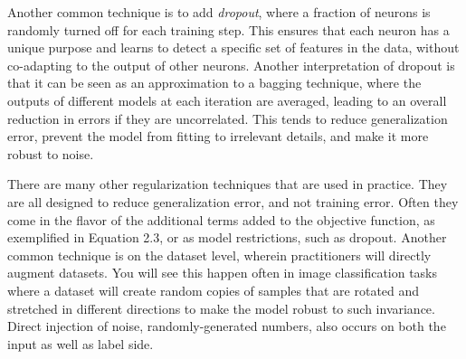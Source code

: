 Another common technique is to add \textit{dropout}, where a fraction of neurons is randomly turned off for each training step.
This ensures that each neuron has a unique purpose and learns to detect a specific set of features in the data, without co-adapting to the output of other neurons.
Another interpretation of dropout is that it can be seen as an approximation to a bagging technique, where the outputs of different models at each iteration are averaged, leading to an overall reduction in errors if they are uncorrelated.
This tends to reduce generalization error, prevent the model from fitting to irrelevant details, and make it more robust to noise.

There are many other regularization techniques that are used in practice. They are all designed to reduce
generalization error, and not training error. Often they come in the flavor of the additional terms added to the
objective function, as exemplified in Equation 2.3, or as model restrictions, such as dropout. Another common technique
is on the dataset level, wherein practitioners will directly augment datasets. You will see this happen often in image classification
tasks where a dataset will create random copies of samples that are rotated and stretched in different directions to make
the model robust to such invariance. Direct injection of noise, randomly-generated numbers, also occurs on both the input
as well as label side.
